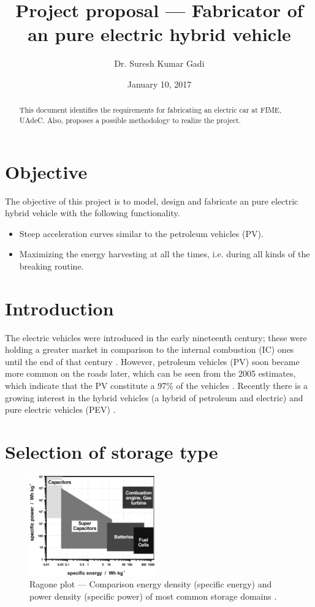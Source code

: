 \documentclass[journal]{IEEEtran}
\title{Project proposal --- Fabricator of an pure electric hybrid vehicle}
\date {January 10, 2017}
\author{Dr. Suresh Kumar Gadi}
\begin{document}
\maketitle
\begin {abstract}
This document identifies the requirements for fabricating an electric car at FIME, UAdeC. Also, proposes a possible methodology to realize the project.
\end {abstract}
\section{Objective}
The objective of this project is to model, design and fabricate an pure electric hybrid vehicle with the following functionality.
\begin{itemize}
	\item Steep acceleration curves similar to the petroleum vehicles (PV).
	\item Maximizing the energy harvesting at all the times, i.e. during all kinds of the breaking routine.
\end{itemize}
\section{Introduction}
The electric vehicles were introduced in the early nineteenth century; these were holding a greater market in comparison to the internal combustion (IC) ones until the end of that century \cite{6487583}. However, petroleum vehicles (PV) soon became more common on the roads later, which can be seen from the 2005 estimates, which indicate that the PV constitute a 97\% of the vehicles \cite{de2012electrical}. Recently there is a growing interest in the hybrid vehicles (a hybrid of petroleum and electric) and pure electric vehicles (PEV) \cite{hori2004future, turrentine1995will, SKGadi-2016EuropeReportEV}.
\section{Selection of storage type}
\begin{figure}[h]
	\centering
	\includegraphics[width=0.48\textwidth]{specific-power-energy}
	\caption{Ragone plot --- Comparison energy density (specific energy) and power density (specific power) of most common storage domains \cite{winter2004batteries}.}
	\label{Fig:power-vs-energy-1}
\end{figure}
\end{document}
